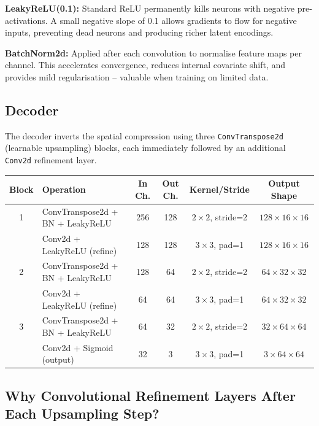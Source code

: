 \documentclass[12pt,a4paper]{article}
\begin{document}
\textbf{LeakyReLU(0.1):} Standard ReLU permanently kills neurons with negative
pre-activations. A small negative slope of 0.1 allows gradients to flow for
negative inputs, preventing dead neurons and producing richer latent encodings.

\textbf{BatchNorm2d:} Applied after each convolution to normalise feature maps
per channel. This accelerates convergence, reduces internal covariate shift,
and provides mild regularisation -- valuable when training on limited data.

\subsection{Decoder}

The decoder inverts the spatial compression using three \texttt{ConvTranspose2d}
(learnable upsampling) blocks, each immediately followed by an additional
\texttt{Conv2d} refinement layer.

\vspace{4pt}
\begin{center}
\begin{tabular}{clcccc}
\toprule
\textbf{Block} & \textbf{Operation} & \textbf{In Ch.} & \textbf{Out Ch.}
               & \textbf{Kernel/Stride} & \textbf{Output Shape} \\
\midrule
1 & ConvTranspose2d + BN + LeakyReLU & 256 & 128 & $2\times2$, stride=2 & $128\times16\times16$ \\
  & Conv2d + LeakyReLU (refine)       & 128 & 128 & $3\times3$, pad=1    & $128\times16\times16$ \\
\midrule
2 & ConvTranspose2d + BN + LeakyReLU & 128 & 64  & $2\times2$, stride=2 & $64\times32\times32$ \\
  & Conv2d + LeakyReLU (refine)       & 64  & 64  & $3\times3$, pad=1    & $64\times32\times32$ \\
\midrule
3 & ConvTranspose2d + BN + LeakyReLU & 64  & 32  & $2\times2$, stride=2 & $32\times64\times64$ \\
  & Conv2d + Sigmoid (output)         & 32  & 3   & $3\times3$, pad=1    & $3\times64\times64$ \\
\bottomrule
\end{tabular}
\end{center}

\subsection{Why Convolutional Refinement Layers After Each Upsampling Step?}
\end{document}
